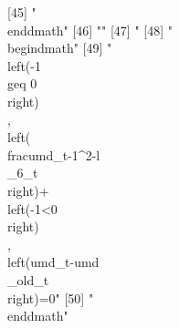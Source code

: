 [45] "\\end{dmath}"                                                                                                                                                                                                                                                                                                                                
[46] ""                                                                                                                                                                                                                                                                                                                                            
[47] "%
[48] "\\begin{dmath}"                                                                                                                                                                                                                                                                                                                              
[49] "\\left(-1\\geq 0\\right)\\, \\left(\\frac{{umd_{t}}}{-1^{2}}-{{l\\_6}_{t}}\\right)+\\left(-1<0\\right)\\, \\left({umd_{t}}-{{umd\\_old}_{t}}\\right)=0"                                                                                                                                                                                      
[50] "\\end{dmath}"                                                                                                                                                                                                                                                                                                                                
